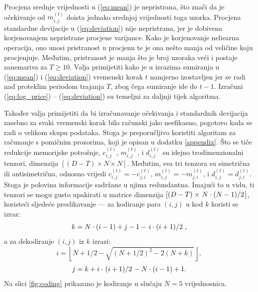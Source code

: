 \documentclass[lmodern, utf8, diplomski, numeric]{fer}
\newcommand{\q}{\left}
\newcommand{\w}{\right}
\begin{document}
  Procjena srednje vrijednosti u (\ref{eq:mean}) je nepristrana, što znači da je očekivanje od $m_{i,j}^{\q(t\w)}$ doista jednako srednjoj vrijednosti toga uzorka.
  Procjena standardne devijacije u (\ref{eq:deviation}) nije nepristrana, jer je dobivena korjenovanjem nepristrane procjene varijance.
  Kako je korjenovanje neliearna operacija, ono unosi pristranost u procjenu te je ona nešto manja od veličine koju procjenjuje.
  Međutim, pristranost je manja što je broj uzoraka veći i postaje zanemariva za $T \ge 10$.
  Valja primijetiti kako je u izrazima sumiranja u (\ref{eq:mean}) i (\ref{eq:deviation}) vremenski korak $t$ namjerno izostavljen jer se radi nad proteklim periodom trajanja $T$, zbog čega sumiranje ide do $t - 1$.
  Izračuni (\ref{eq:log_price}) -- (\ref{eq:deviation}) su temeljni za daljnji tijek algoritma.

  Također valja primijetiti da bi izračunavanje očekivanja i standardnih devijacija zasebno za svaki vremenski korak bilo računski jako neefikasno, pogotovo kada se radi o velikom skupu podataka.
  Stoga je preporučljivo koristiti algoritam za računanje s pomičnim prozorima, koji je opisan u dodatku \ref{appendix}.
  Što se tiče redukcije memorijske potrošnje, $c_{i,j}^{\q(t\w)}$, $m_{i,j}^{\q(t\w)}$, i $d_{i,j}^{\q(t\w)}$ su idejno trodimenzionalni tenzori, dimenzija $\q[(D - T) \times N \times N\w]$.
  Međutim, sva tri tenzora su simetrična ili antisimetrična, odnosno vrijedi $c_{i,j}^{\q(t\w)} = -c_{j,i}^{\q(t\w)}$, $m_{i,j}^{\q(t\w)} = -m_{j,i}^{\q(t\w)}$, i $d_{i,j}^{\q(t\w)} = d_{j,i}^{\q(t\w)}$. Stoga je polovina informacije sadržane u njima redundantna.
  Imajući to u vidu, ti tenzori se mogu gusto upakirati u matrice dimenzija $\q[(D - T) \times \q. N\cdot(N - 1) \middle/ 2\w.\w]$, koristeći sljedeće preslikavanje --- za kodiranje para $(i,j)$ u kod $k$ koristi se izraz:
  \begin{equation} k = N \cdot (i - 1) + j - 1 - \q. i \cdot (i + 1) \middle/ 2\w., \end{equation}
  a za dekodiranje $(i, j)$ iz $k$ izrazi:
  \begin{equation} i = \q \lfloor N + 1/2 - \sqrt{(N + 1/2)^2 - 2(N + k)} \w \rfloor, \end{equation}
  \begin{equation} j = k + i \cdot \q.(i + 1) \middle/ 2\w. - N \cdot (i - 1) + 1. \end{equation}
  Na slici \ref{fig:coding} prikazano je kodiranje u slučaju $N = 5$ vrijednosnica.
  
\end{document}
